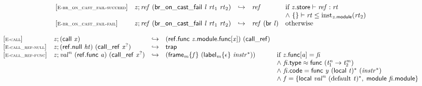 \vspace{1ex}

$$
\begin{array}{@{}l@{}lcl@{}l@{}}
{[\textsc{\scriptsize E{-}br\_on\_cast\_fail{-}succeed}]} \quad & {\mathit{z}} ; {\mathit{ref}}~(\mathsf{br\_on\_cast\_fail}~{\mathit{l}}~{\mathit{rt}}_{{1}}~{\mathit{rt}}_{{2}}) &\hookrightarrow& {\mathit{ref}} &\quad
  \mbox{if}~{\mathit{z}}.\mathsf{store} \vdash {\mathit{ref}} : {\mathit{rt}} \\
 &&&&\quad {\land}~\{ \begin{array}[t]{@{}l@{}}
 \}\end{array} \vdash {\mathit{rt}} \leq {{\mathrm{inst}}}_{{\mathit{z}}.\mathsf{module}}({\mathit{rt}}_{{2}}) \\
{[\textsc{\scriptsize E{-}br\_on\_cast\_fail{-}fail}]} \quad & {\mathit{z}} ; {\mathit{ref}}~(\mathsf{br\_on\_cast\_fail}~{\mathit{l}}~{\mathit{rt}}_{{1}}~{\mathit{rt}}_{{2}}) &\hookrightarrow& {\mathit{ref}}~(\mathsf{br}~{\mathit{l}}) &\quad
  \mbox{otherwise} \\
\end{array}
$$

\vspace{1ex}

$$
\begin{array}{@{}l@{}lcl@{}l@{}}
{[\textsc{\scriptsize E{-}call}]} \quad & {\mathit{z}} ; (\mathsf{call}~{\mathit{x}}) &\hookrightarrow& (\mathsf{ref.func}~{\mathit{z}}.\mathsf{module}.\mathsf{func}{}[{\mathit{x}}])~(\mathsf{call\_ref}) &  \\
{[\textsc{\scriptsize E{-}call\_ref{-}null}]} \quad & {\mathit{z}} ; (\mathsf{ref.null}~{\mathit{ht}})~(\mathsf{call\_ref}~{{\mathit{x}}^?}) &\hookrightarrow& \mathsf{trap} &  \\
{[\textsc{\scriptsize E{-}call\_ref{-}func}]} \quad & {\mathit{z}} ; {{\mathit{val}}^{{\mathit{n}}}}~(\mathsf{ref.func}~{\mathit{a}})~(\mathsf{call\_ref}~{{\mathit{x}}^?}) &\hookrightarrow& ({{\mathsf{frame}}_{{\mathit{m}}}}{\{{\mathit{f}}\}}~({{\mathsf{label}}_{{\mathit{m}}}}{\{\epsilon\}}~{{\mathit{instr}}^\ast})) &\quad
  \mbox{if}~{\mathit{z}}.\mathsf{func}{}[{\mathit{a}}] = {\mathit{fi}} \\
 &&&&\quad {\land}~{\mathit{fi}}.\mathsf{type} \approx \mathsf{func}~({{\mathit{t}}_{{1}}^{{\mathit{n}}}} \rightarrow {{\mathit{t}}_{{2}}^{{\mathit{m}}}}) \\
 &&&&\quad {\land}~{\mathit{fi}}.\mathsf{code} = \mathsf{func}~{\mathit{y}}~{(\mathsf{local}~{\mathit{t}})^\ast}~({{\mathit{instr}}^\ast}) \\
 &&&&\quad {\land}~{\mathit{f}} = \{ \begin{array}[t]{@{}l@{}}
\mathsf{local}~{{\mathit{val}}^{{\mathit{n}}}}~{({\mathrm{default}}~{\mathit{t}})^\ast},\; \mathsf{module}~{\mathit{fi}}.\mathsf{module} \}\end{array} \\
\end{array}
$$

